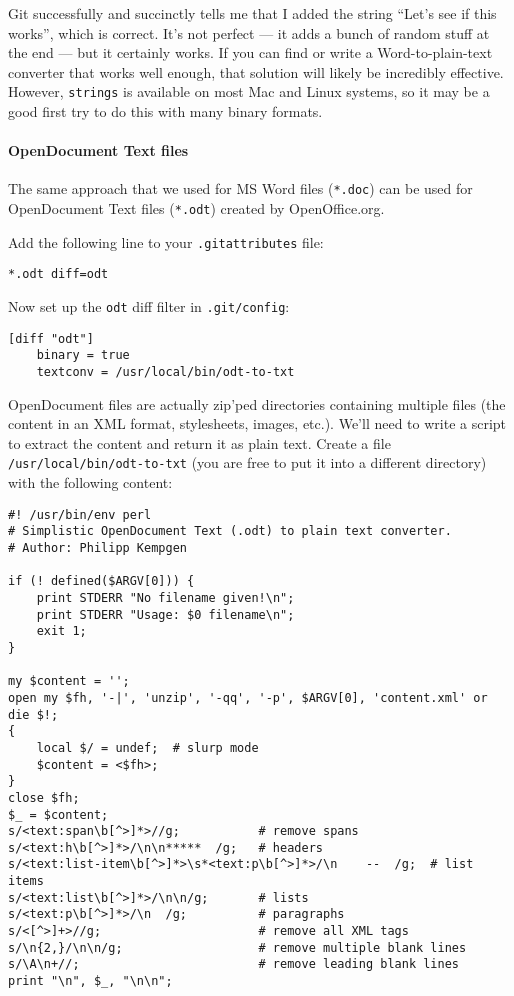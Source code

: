 \documentclass[a4paper]{book}
\begin{document}
Git successfully and succinctly tells me that I added the string “Let's see if this works”, which is correct. It's not perfect --- it adds a bunch of random stuff at the end --- but it certainly works. If you can find or write a Word-to-plain-text converter that works well enough, that solution will likely be incredibly effective. However, \texttt{strings} is available on most Mac and Linux systems, so it may be a good first try to do this with many binary formats.

\paragraph{OpenDocument Text files}

The same approach that we used for MS Word files (\texttt{*.doc}) can be used for OpenDocument Text files (\texttt{*.odt}) created by OpenOffice.org.

Add the following line to your \texttt{.gitattributes} file:

\begin{shaded}\begin{verbatim}
*.odt diff=odt
\end{verbatim}\end{shaded}

Now set up the \texttt{odt} diff filter in \texttt{.git/config}:

\begin{shaded}\begin{verbatim}
[diff "odt"]
	binary = true
	textconv = /usr/local/bin/odt-to-txt
\end{verbatim}\end{shaded}

OpenDocument files are actually zip'ped directories containing multiple files (the content in an XML format, stylesheets, images, etc.). We'll need to write a script to extract the content and return it as plain text. Create a file \texttt{/usr/local/bin/odt-to-txt} (you are free to put it into a different directory) with the following content:

\begin{shaded}\begin{verbatim}
#! /usr/bin/env perl
# Simplistic OpenDocument Text (.odt) to plain text converter.
# Author: Philipp Kempgen

if (! defined($ARGV[0])) {
	print STDERR "No filename given!\n";
	print STDERR "Usage: $0 filename\n";
	exit 1;
}

my $content = '';
open my $fh, '-|', 'unzip', '-qq', '-p', $ARGV[0], 'content.xml' or die $!;
{
	local $/ = undef;  # slurp mode
	$content = <$fh>;
}
close $fh;
$_ = $content;
s/<text:span\b[^>]*>//g;           # remove spans
s/<text:h\b[^>]*>/\n\n*****  /g;   # headers
s/<text:list-item\b[^>]*>\s*<text:p\b[^>]*>/\n    --  /g;  # list items
s/<text:list\b[^>]*>/\n\n/g;       # lists
s/<text:p\b[^>]*>/\n  /g;          # paragraphs
s/<[^>]+>//g;                      # remove all XML tags
s/\n{2,}/\n\n/g;                   # remove multiple blank lines
s/\A\n+//;                         # remove leading blank lines
print "\n", $_, "\n\n";
\end{verbatim}\end{shaded}
\end{document}

